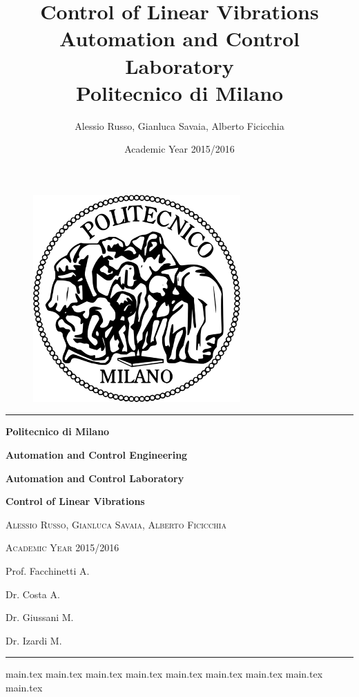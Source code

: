 \documentclass[10pt,a4paper,titlepage]{report}
\author{Alessio Russo, Gianluca Savaia, Alberto Ficicchia}
\title{Control of Linear Vibrations \\
\Large Automation and Control Laboratory \\
 Politecnico di Milano}
\date{Academic Year 2015/2016}
\begin{document}
\begin{titlepage}

\centering		
\vspace{3cm}
\begin{figure}[!h]
\centering
  \includegraphics[scale=0.7]{img/logo.png} 
\end{figure}
\rule{\textwidth}{1pt}
 \par 
\vspace{2cm}
{\Large\bfseries Politecnico di Milano \par}
{\Large\bfseries Automation and Control Engineering\par}
\vspace{2cm}
{\Large\bfseries Automation and Control Laboratory\par}
{\huge\bfseries Control of Linear Vibrations\par}
\vspace{0.3cm}
{\large\scshape Alessio Russo, Gianluca Savaia, Alberto Ficicchia\par}
\vspace{0.3cm}
{\scshape Academic Year 2015/2016\par}
\vspace{3.5cm}
\hspace{12cm}
{ Prof. Facchinetti A.\par}
\hspace{11cm}
{ Dr. Costa A.\par}
\hspace{11.5cm}
{ Dr. Giussani M.\par}
\hspace{11.1cm}
{ Dr. Izardi M.\par}
\rule{\textwidth}{1pt}
\end{titlepage}
\tableofcontents

{main.tex}
{main.tex}
\newpage
{main.tex}
\newpage
{main.tex}
\newpage
	{main.tex}
\newpage
{main.tex}
\newpage
{main.tex}
\newpage
{main.tex}
\newpage
{main.tex}

\printbibliography
\end{document}
